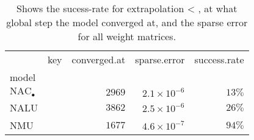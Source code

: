 \begin{table}[H]
\centering
\caption{Shows the sucess-rate for extrapolation < \epsilon, at what global step the model converged at, and the sparse error for all weight matrices.} 
\begin{tabular}{ll |rrr}
  \hline
                            & key & \multicolumn{1}{l}{          converged.at} & \multicolumn{1}{l}{          sparse.error} & \multicolumn{1}{l}{          success.rate} \\ 
  model                      &     & \multicolumn{1}{l}{                      } & \multicolumn{1}{l}{                      } & \multicolumn{1}{l}{                      } \\ 
   \hline
${\mathrm{NAC}_\bullet}$ &     & $2969$                & $2.1 \times 10^{-6}$ & $13\%$               \\ 
  NALU                       &     & $3862$                & $2.5 \times 10^{-6}$ & $26\%$               \\ 
  NMU                        &     & $1677$                & $4.6 \times 10^{-7}$ & $94\%$               \\ 
   \hline
\end{tabular}
\end{table}
